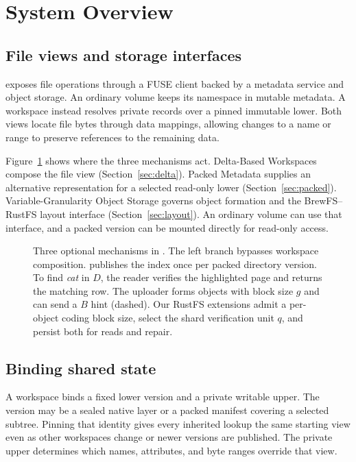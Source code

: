 \section{System Overview}
\label{sec:overview}

\subsection{File views and storage interfaces}

\sys exposes file operations through a FUSE client backed by a metadata
service and object storage. An ordinary volume keeps its namespace in
mutable metadata. A workspace instead resolves private records over a
pinned immutable lower. Both views locate file bytes through data
mappings, allowing changes to a name or range to preserve references
to the remaining data.

Figure~\ref{fig:overview} shows where the three mechanisms act.
Delta-Based Workspaces compose the file view
(Section~\ref{sec:delta}). Packed Metadata supplies an alternative
representation for a selected read-only lower
(Section~\ref{sec:packed}). Variable-Granularity Object Storage governs
object formation and the BrewFS--RustFS layout interface
(Section~\ref{sec:layout}). An ordinary volume can use that interface,
and a packed version can be mounted directly for read-only access.

\begin{figure}[!t]
\centering

\caption{Three optional mechanisms in \sys. The left branch bypasses
workspace composition. \sys publishes the index once per packed
directory version. To find \emph{cat} in $D$, the reader verifies the
highlighted page and returns the matching row. The uploader forms
objects with block size $g$ and can send a $B$ hint (dashed). Our RustFS
extensions admit a per-object coding block size, select the shard
verification unit $q$, and persist both for reads and repair.}
\label{fig:overview}
\end{figure}

\subsection{Binding shared state}

A workspace binds a fixed lower version and a private writable upper.
The version may be a sealed native layer or a packed manifest covering
a selected subtree. Pinning that identity gives every inherited lookup
the same starting view even as other workspaces change or newer versions
are published. The private upper determines which names, attributes,
and byte ranges override that view.

